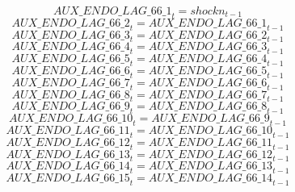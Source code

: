 \begin{dmath}
{AUX\_ENDO\_LAG\_66\_1}_{t}={shockn}_{t-1}
\end{dmath}
\begin{dmath}
{AUX\_ENDO\_LAG\_66\_2}_{t}={AUX\_ENDO\_LAG\_66\_1}_{t-1}
\end{dmath}
\begin{dmath}
{AUX\_ENDO\_LAG\_66\_3}_{t}={AUX\_ENDO\_LAG\_66\_2}_{t-1}
\end{dmath}
\begin{dmath}
{AUX\_ENDO\_LAG\_66\_4}_{t}={AUX\_ENDO\_LAG\_66\_3}_{t-1}
\end{dmath}
\begin{dmath}
{AUX\_ENDO\_LAG\_66\_5}_{t}={AUX\_ENDO\_LAG\_66\_4}_{t-1}
\end{dmath}
\begin{dmath}
{AUX\_ENDO\_LAG\_66\_6}_{t}={AUX\_ENDO\_LAG\_66\_5}_{t-1}
\end{dmath}
\begin{dmath}
{AUX\_ENDO\_LAG\_66\_7}_{t}={AUX\_ENDO\_LAG\_66\_6}_{t-1}
\end{dmath}
\begin{dmath}
{AUX\_ENDO\_LAG\_66\_8}_{t}={AUX\_ENDO\_LAG\_66\_7}_{t-1}
\end{dmath}
\begin{dmath}
{AUX\_ENDO\_LAG\_66\_9}_{t}={AUX\_ENDO\_LAG\_66\_8}_{t-1}
\end{dmath}
\begin{dmath}
{AUX\_ENDO\_LAG\_66\_10}_{t}={AUX\_ENDO\_LAG\_66\_9}_{t-1}
\end{dmath}
\begin{dmath}
{AUX\_ENDO\_LAG\_66\_11}_{t}={AUX\_ENDO\_LAG\_66\_10}_{t-1}
\end{dmath}
\begin{dmath}
{AUX\_ENDO\_LAG\_66\_12}_{t}={AUX\_ENDO\_LAG\_66\_11}_{t-1}
\end{dmath}
\begin{dmath}
{AUX\_ENDO\_LAG\_66\_13}_{t}={AUX\_ENDO\_LAG\_66\_12}_{t-1}
\end{dmath}
\begin{dmath}
{AUX\_ENDO\_LAG\_66\_14}_{t}={AUX\_ENDO\_LAG\_66\_13}_{t-1}
\end{dmath}
\begin{dmath}
{AUX\_ENDO\_LAG\_66\_15}_{t}={AUX\_ENDO\_LAG\_66\_14}_{t-1}
\end{dmath}
